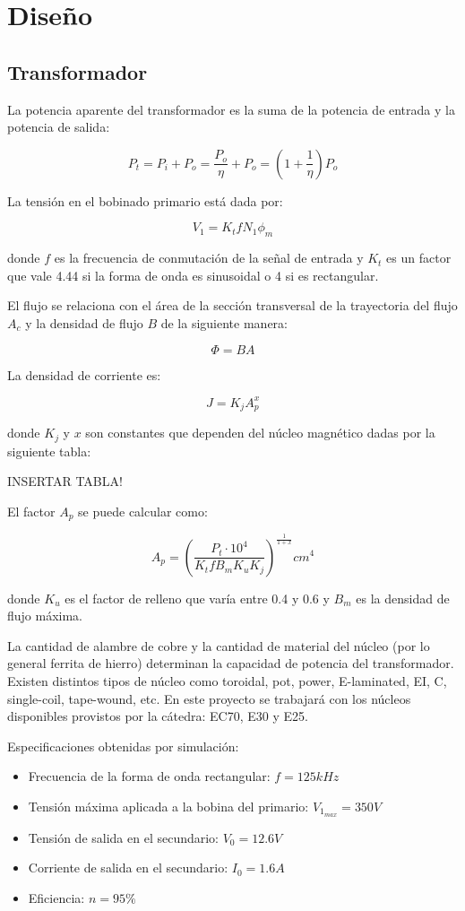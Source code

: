 \section{Diseño}

\subsection{Transformador}

La potencia aparente del transformador es la suma de la potencia de entrada y la potencia de salida:

$$ P_{t}=P_{i}+P_{o}=\frac{P_{o}}{\eta}+P_{o}=(1+\frac{1}{\eta})P_{o} $$

La tensión en el bobinado primario está dada por: 

$$ V_{1}=K_{t} f N_{1} \phi_{m} $$

donde $f$ es la frecuencia de conmutación de la señal de entrada y 
$K_t$ es un factor que vale 4.44 si la forma de onda es sinusoidal o 4 si es rectangular.

El flujo se relaciona con el área de la sección transversal de la trayectoria del flujo $A_{c}$ y la densidad de flujo $B$ de la siguiente manera:

$$ \Phi=BA $$

La densidad de corriente es:

$$ J=K_{j} A_{p}^{x} $$

donde $K_{j}$ y $x$ son constantes que dependen del núcleo magnético dadas por la siguiente tabla:

INSERTAR TABLA!

El factor $A_{p}$ se puede calcular como: 

$$ A_{p}=\left(\frac{P_{t} \cdot 10^{4}}{K_{t} f B_{m} K_{u} K_{j}}\right)^{\frac{1}{1+x}} {cm}^{4} $$

donde $K_u$ es el factor de relleno que varía entre 0.4 y 0.6 y $B_m$ es la densidad de flujo máxima.

La cantidad de alambre de cobre y la cantidad de material del núcleo (por lo general ferrita de hierro) determinan la capacidad de potencia del transformador. 
Existen distintos tipos de núcleo como toroidal, pot, power, E-laminated, EI, C, single-coil, tape-wound, etc. 
En este proyecto se trabajará con los núcleos disponibles provistos por la cátedra: EC70, E30 y E25. 

Especificaciones obtenidas por simulación:
\begin{itemize}
    \item Frecuencia de la forma de onda rectangular: $f=125kHz$
    \item Tensión máxima aplicada a la bobina del primario: $V_{1_{max}}=350V$
    \item Tensión de salida en el secundario: $V_{0}=12.6V$
    \item Corriente de salida en el secundario: $I_{0}=1.6A$
    \item Eficiencia: $n=95\%$
\end{itemize}

